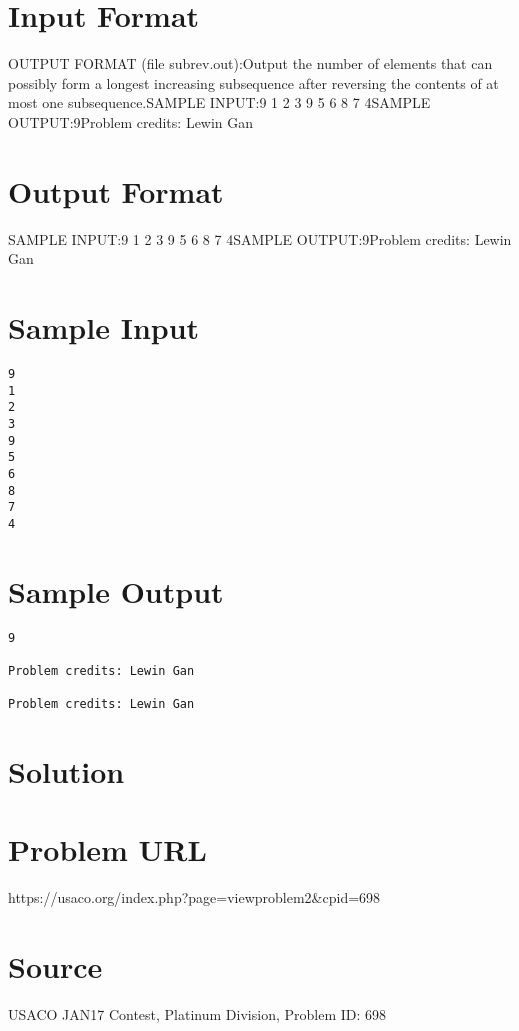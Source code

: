 \documentclass[12pt]{article}
\begin{document}
\section*{Input Format}
OUTPUT FORMAT (file subrev.out):Output the number of elements that can possibly form a longest increasing
subsequence after reversing the contents of at most one subsequence.SAMPLE INPUT:9
1
2
3
9
5
6
8
7
4SAMPLE OUTPUT:9Problem credits: Lewin Gan

\section*{Output Format}
SAMPLE INPUT:9
1
2
3
9
5
6
8
7
4SAMPLE OUTPUT:9Problem credits: Lewin Gan

\section*{Sample Input}
\begin{verbatim}
9
1
2
3
9
5
6
8
7
4
\end{verbatim}

\section*{Sample Output}
\begin{verbatim}
9

Problem credits: Lewin Gan

Problem credits: Lewin Gan
\end{verbatim}

\section*{Solution}


\section*{Problem URL}
https://usaco.org/index.php?page=viewproblem2&cpid=698

\section*{Source}
USACO JAN17 Contest, Platinum Division, Problem ID: 698
\end{document}
